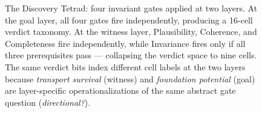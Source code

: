 \begin{figure}[t]
\caption{The Discovery Tetrad: four invariant gates applied at two layers.
At the goal layer, all four gates fire independently, producing a 16-cell
verdict taxonomy. At the witness layer, Plausibility, Coherence, and
Completeness fire independently, while Invariance fires only if all three
prerequisites pass --- collapsing the verdict space to nine cells.
The same verdict bits index different cell labels at the two layers because
\textit{transport survival} (witness) and \textit{foundation potential}
(goal) are layer-specific operationalizations of the same abstract gate
question (\textit{directional?}).}
\label{fig:tetrad_arch}
\end{figure}

